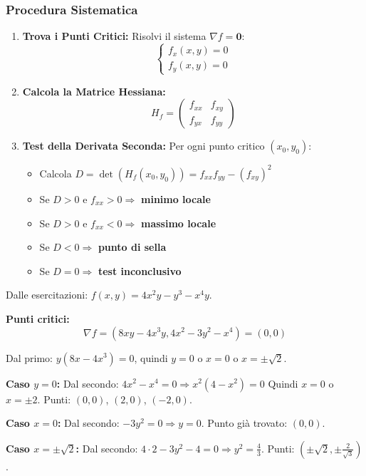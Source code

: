 \subsubsection{Procedura Sistematica}
\begin{enumerate}
    \item \textbf{Trova i Punti Critici:} Risolvi il sistema $\nabla f = \mathbf{0}$:
    \[ \begin{cases} f_x(x,y) = 0 \\ f_y(x,y) = 0 \end{cases} \]
    
    \item \textbf{Calcola la Matrice Hessiana:}
    \[ H_f = \begin{pmatrix} f_{xx} & f_{xy} \\ f_{yx} & f_{yy} \end{pmatrix} \]
    
    \item \textbf{Test della Derivata Seconda:} Per ogni punto critico $(x_0,y_0)$:
    \begin{itemize}
        \item Calcola $D = \det(H_f(x_0,y_0)) = f_{xx}f_{yy} - (f_{xy})^2$
        \item Se $D > 0$ e $f_{xx} > 0 \Rightarrow$ \textbf{minimo locale}
        \item Se $D > 0$ e $f_{xx} < 0 \Rightarrow$ \textbf{massimo locale}
        \item Se $D < 0 \Rightarrow$ \textbf{punto di sella}
        \item Se $D = 0 \Rightarrow$ \textbf{test inconclusivo}
    \end{itemize}
\end{enumerate}

\begin{esempio}
Dalle esercitazioni: $f(x,y) = 4x^2 y - y^3 - x^4 y$.

\textbf{Punti critici:}
\[ \nabla f = (8xy - 4x^3 y, 4x^2 - 3y^2 - x^4) = (0,0) \]

Dal primo: $y(8x - 4x^3) = 0$, quindi $y = 0$ o $x = 0$ o $x = \pm\sqrt{2}$.

\textbf{Caso $y = 0$:} Dal secondo: $4x^2 - x^4 = 0 \Rightarrow x^2(4-x^2) = 0$
Quindi $x = 0$ o $x = \pm 2$.
Punti: $(0,0)$, $(2,0)$, $(-2,0)$.

\textbf{Caso $x = 0$:} Dal secondo: $-3y^2 = 0 \Rightarrow y = 0$.
Punto già trovato: $(0,0)$.

\textbf{Caso $x = \pm\sqrt{2}$:} Dal secondo: $4 \cdot 2 - 3y^2 - 4 = 0 \Rightarrow y^2 = \frac{4}{3}$.
Punti: $(\pm\sqrt{2}, \pm\frac{2}{\sqrt{3}})$.
\end{esempio}

